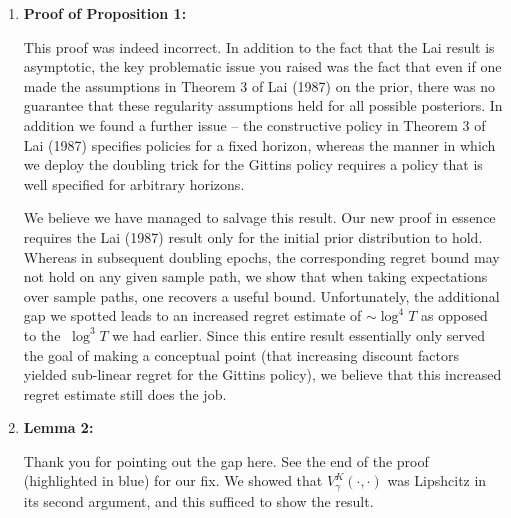 \documentclass[11pt]{article}
\newcommand{\1}{\ensuremath{\mathbf{1}}} %
\theoremstyle{thm-sf}
\begin{document}
	\begin{enumerate}
		\item \textbf {Proof of Proposition 1:} 	
		
		{\color{blue}
		This proof was indeed incorrect. In addition to the fact that the Lai result is asymptotic, the key problematic issue you raised was the fact that even if one made the assumptions in Theorem 3 of Lai (1987) on the prior, there was no guarantee that these regularity assumptions held for all possible posteriors. In addition we found a further issue -- the constructive policy in Theorem 3 of Lai (1987) specifies policies for a fixed horizon, whereas the manner in which we deploy the doubling trick for the Gittins policy requires a policy that is well specified for arbitrary horizons. 
		
		We believe we have managed to salvage this result. Our new proof in essence requires the Lai (1987) result only for the initial prior distribution to hold. Whereas in subsequent doubling epochs, the corresponding regret bound may not hold on any given sample path, we show that when taking expectations over sample paths, one recovers a useful bound. Unfortunately, the additional gap we spotted leads to an increased regret estimate of $\sim \log^4 T$ as opposed to the $~ \log^3 T$ we had earlier. Since this entire result essentially only served the goal of making a conceptual point (that increasing discount factors yielded sub-linear regret for the Gittins policy), we believe that this increased regret estimate still does the job. 
}
		
		
		\item \textbf {Lemma 2:} 
		
		{\color{blue}	
		Thank you for pointing out the gap here. See the end of the proof (highlighted in blue) for our fix. We showed that $V^K_\gamma(\cdot, \cdot)$ was Lipshcitz in its second argument, and this sufficed to show the result.}
		
	\end{enumerate}
	
\end{document}
